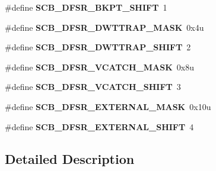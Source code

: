 \begin{DoxyCompactItemize}
\item 
\mbox{\label{group___s_c_b___register___masks_gab2da04235aa0df8d6d867336d1b2c9c5}} 
\#define {\bfseries S\+C\+B\+\_\+\+D\+F\+S\+R\+\_\+\+B\+K\+P\+T\+\_\+\+S\+H\+I\+FT}~1
\item 
\mbox{\label{group___s_c_b___register___masks_gaa6d8e1428ddb9a650f965c33e09bad7a}} 
\#define {\bfseries S\+C\+B\+\_\+\+D\+F\+S\+R\+\_\+\+D\+W\+T\+T\+R\+A\+P\+\_\+\+M\+A\+SK}~0x4u
\item 
\mbox{\label{group___s_c_b___register___masks_ga6a1d724f4fe22533bd37c3f5179d2219}} 
\#define {\bfseries S\+C\+B\+\_\+\+D\+F\+S\+R\+\_\+\+D\+W\+T\+T\+R\+A\+P\+\_\+\+S\+H\+I\+FT}~2
\item 
\mbox{\label{group___s_c_b___register___masks_ga44491a07e0ef59bfe8f7797f03acfabd}} 
\#define {\bfseries S\+C\+B\+\_\+\+D\+F\+S\+R\+\_\+\+V\+C\+A\+T\+C\+H\+\_\+\+M\+A\+SK}~0x8u
\item 
\mbox{\label{group___s_c_b___register___masks_gaa503bd566d848235828e742233b8ff20}} 
\#define {\bfseries S\+C\+B\+\_\+\+D\+F\+S\+R\+\_\+\+V\+C\+A\+T\+C\+H\+\_\+\+S\+H\+I\+FT}~3
\item 
\mbox{\label{group___s_c_b___register___masks_ga938e2bfb90d14dba16b2dd249b6cdbdd}} 
\#define {\bfseries S\+C\+B\+\_\+\+D\+F\+S\+R\+\_\+\+E\+X\+T\+E\+R\+N\+A\+L\+\_\+\+M\+A\+SK}~0x10u
\item 
\mbox{\label{group___s_c_b___register___masks_ga0c4c283537c78ec5650fd7eaaf8c9cd7}} 
\#define {\bfseries S\+C\+B\+\_\+\+D\+F\+S\+R\+\_\+\+E\+X\+T\+E\+R\+N\+A\+L\+\_\+\+S\+H\+I\+FT}~4
\end{DoxyCompactItemize}


\subsection{Detailed Description}

